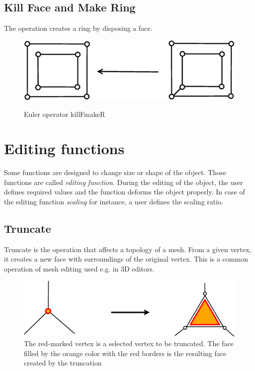 \subsection{Kill Face and Make Ring}

The operation creates a ring by disposing a face.

\begin{figure}[H]
\centering
\includegraphics[scale=0.25]{../img/killFmakeR.eps}
\label{fig:killfmaker}
\caption{Euler operator killFmakeR}
\end{figure}


\section{Editing functions}
\label{sec:edit_f}
Some functions are designed to change size or shape of the object. Those functions are called 
\emph{editing function}.
During the editing of the object, the user defines required values and the function deforms the
object properly. In case of the editing function \emph{scaling} for instance, a user defines the scaling
ratio.

\subsection{Truncate}

Truncate is the operation that affects a topology of a mesh. From a given vertex, it creates a new face with
surroundings of the original vertex. This is a common operation of mesh editing used e.g. in
3D editors.\\

\begin{figure}[ht]
\centering
\includegraphics[scale=0.2]{../img/truncate.eps}
\caption{The red-marked vertex is a selected vertex to be truncated.
The face filled by the orange color with the red borders is the resulting face created by the truncation}
\end{figure}

